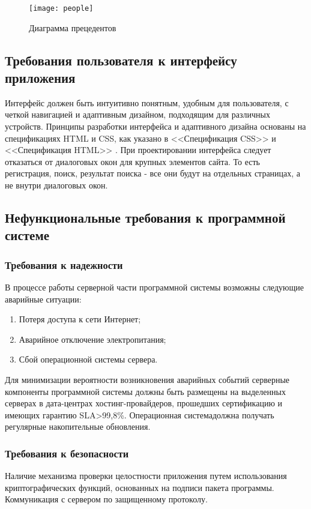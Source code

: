 \begin{figure}[ht]
\centering
\texttt{[image: people]}
\caption{Диаграмма прецедентов}
\label{people:image}
\end{figure}

\subsection{Требования пользователя к интерфейсу приложения}
Интерфейс должен быть интуитивно понятным, удобным для пользователя, с четкой навигацией и адаптивным дизайном, подходящим для различных устройств. Принципы разработки интерфейса и адаптивного дизайна основаны на спецификациях HTML и CSS, как указано в <<Спецификация CSS>> \cite{cssspecs} и <<Спецификация HTML>> \cite{htmlbook}.
При проектировании интерфейса следует отказаться от диалоговых окон для крупных элементов сайта. То есть регистрация, поиск, результат поиска - все они будут на отдельных страницах, а не внутри диалоговых окон.

\subsection{Нефункциональные требования к программной системе}

\subsubsection{Требования к надежности}
В процессе работы серверной части программной системы возможны следующие аварийные ситуации:
\begin{enumerate}
\item Потеря доступа к сети Интернет;
\item Аварийное отключение электропитания;
\item Сбой операционной системы сервера.
\end{enumerate}

Для минимизации вероятности возникновения аварийных событий серверные компоненты программной системы должны быть размещены на выделенных серверах в дата-центрах хостинг-провайдеров, прошедших сертификацию и имеющих гарантию SLA>99,8\%. Операционная системадолжна получать регулярные накопительные обновления.

\subsubsection{Требования к безопасности}
Наличие механизма проверки целостности приложения путем использования криптографических функций, основанных на подписи пакета программы. Коммуникация с сервером по защищенному протоколу.

